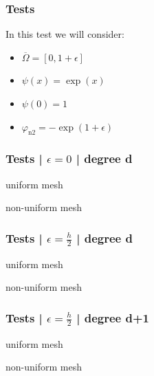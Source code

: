 \documentclass[10pt,fleqn]{beamer}
\begin{document}
\begin{frame}
\frametitle{Tests}

In this test we will consider:
\begin{itemize}
\item $\overline{\Omega}=[0,1+\epsilon]$
\item $\psi(x)=\exp(x)$
\item $\psi(0)=1$
\item $\varphi_{\text{n2}}=-\exp(1+\epsilon)$
\end{itemize}
\end{frame}

\begin{frame}
\frametitle{Tests | $\epsilon=0$ | degree d}

\begin{minipage}[b]{0.49\textwidth}
\small
\centering 
uniform mesh

\end{minipage}
\begin{minipage}[b]{0.49\textwidth}
\small
\centering 
non-uniform mesh

\end{minipage}
\end{frame}

\begin{frame}
\frametitle{Tests | $\epsilon=\frac{h}{2}$ | degree d}

\begin{minipage}[b]{0.49\textwidth}
\small
\centering 
uniform mesh

\end{minipage}
\begin{minipage}[b]{0.49\textwidth}
\small
\centering 
non-uniform mesh

\end{minipage}
\end{frame}

\begin{frame}
\frametitle{Tests | $\epsilon=\frac{h}{2}$ | degree d+1}

\begin{minipage}[b]{0.49\textwidth}
\small
\centering 
uniform mesh

\end{minipage}
\begin{minipage}[b]{0.49\textwidth}
\small
\centering 
non-uniform mesh

\end{minipage}
\end{frame}
\end{document}
